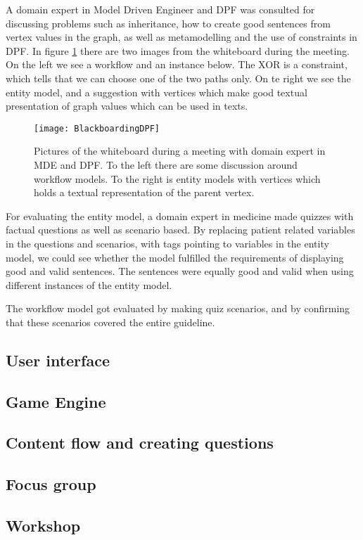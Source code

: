 A domain expert in Model Driven Engineer and DPF was consulted for discussing problems such as inheritance, how to create good sentences from vertex values in the graph, as well as metamodelling and the use of constraints in DPF. In figure \ref{fig:BlackboardingDPF} there are two images from the whiteboard during the meeting. On the left we see a workflow and an instance below. The XOR is a constraint, which tells that we can choose one of the two  paths only. On te right we see the entity model, and a suggestion with vertices which make good textual presentation of graph values which can be used in texts. 
\begin{figure}[h!]
	\caption {Pictures of the whiteboard during a meeting with domain expert in MDE and DPF. To the left there are some discussion around workflow models. To the right is entity models with vertices which holds a textual representation of the parent vertex.   }
	\label{fig:BlackboardingDPF}
	\texttt{[image: BlackboardingDPF]}
\end{figure}

For evaluating the entity model, a domain expert in medicine made quizzes with factual questions as well as scenario based. By replacing patient related variables in the questions and scenarios, with tags pointing to variables in the entity model, we could see whether the model fulfilled the requirements of displaying good and valid sentences. The sentences were equally good and valid when using different instances of the entity model.

The workflow model got evaluated by making quiz scenarios, and by confirming that these scenarios covered the entire guideline.



 
\subsection{User interface}
\subsection{Game Engine}
\subsection{Content flow and creating questions}



\subsection{Focus group}

\subsection{Workshop}